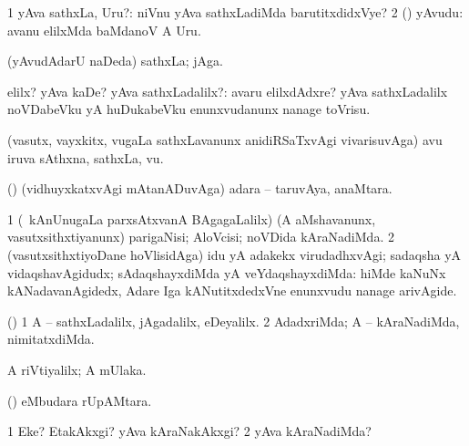 \bentry
{}
\gl{\sanA}
\expl{}
\bmng
\bnum
\num{1} yAva sathxLa, Uru?:  niVnu yAva sathxLadiMda barutitxdidxVye? 
\num{2} (\AmA) yAvudu:  avanu elilxMda baMdanoV A Uru. 
\enum
\emng
\eentry

\bentry
{}
\gl{\nA}
\expl{}
\bmng
(yAvudAdarU naDeda) sathxLa; jAga. 
\emng
\eentry

\bentry
{} 
\gl{\kirxvi}
\expl{}
\bmng
elilx? yAva kaDe? yAva sathxLadalilx?:  avaru elilxdAdxre?  yAva sathxLadalilx noVDabeVku yA huDukabeVku enunxvudanunx nanage toVrisu. 
\emng
\eentry

\bentry
{}
\pron{}
\gl{\nA}
\expl{}
\bmng
(vasutx, vayxkitx, \mo vugaLa sathxLavanunx anidiRSaTxvAgi vivarisuvAga) avu iruva sAthxna, sathxLa, \mo vu. 
\emng
\eentry

\bentry
{} 
\gl{\saMavayx}
\expl{}
\bmng
(\aupa) (vidhuyxkatxvAgi mAtanADuvAga) adara -- taruvAya, anaMtara. 
\emng
\eentry

\bentry
{} 
\gl{\saMavayx}
\expl{}
\bmng
\bnum
\num{1} (\kanmu\ kAnUnugaLa parxsAtxvanA BAgagaLalilx) (A aMshavanunx, vasutxsithxtiyanunx) parigaNisi; AloVcisi; noVDida kAraNadiMda. 
\num{2} (vasutxsithxtiyoDane hoVlisidAga) idu yA adakekx virudadhxvAgi; sadaqsha yA vidaqshavAgidudx; sAdaqshayxdiMda yA veYdaqshayxdiMda:  hiMde kaNuNx kANadavanAgidedx, Adare Iga kANutitxdedxVne enunxvudu nanage arivAgide. 
\enum
\emng
\eentry

\bentry
{} 
\gl{\saMavayx}
\expl{}
\bmng
(\pArxparx) 
\bnum
\num{1} A -- sathxLadalilx, jAgadalilx, eDeyalilx. 
\num{2} AdadxriMda; A -- kAraNadiMda, nimitatxdiMda. 
\enum
\emng
\eentry

\bentry
{} 
\gl{\saMavayx}
\expl{}
\bmng
A riVtiyalilx; A mUlaka. 
\emng
\eentry

\bentry
{} 
\expl{}
\bmng
(\kAparx)  eMbudara rUpAMtara. 
\emng
\eentry

\bentry
{} 
\gl{\kirxvi}
\expl{(\pArxparx) }
\bmng
\bnum
\num{1} Eke? EtakAkxgi? yAva kAraNakAkxgi? 
\num{2} yAva kAraNadiMda? 
\enum
\emng
\eentry

